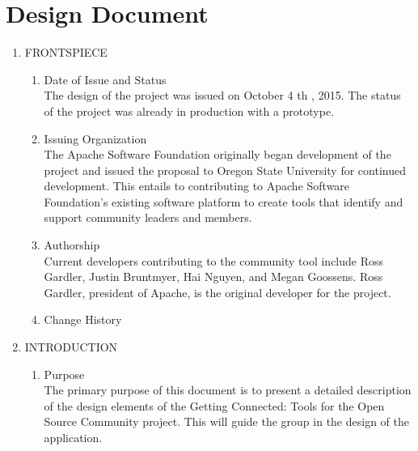 \documentclass[draftclsnofoot,10pt,onecolumn]{IEEEtran} %
\begin{document}
\section{Design Document}

\begin{enumerate}
\item FRONTSPIECE \\
	\begin{enumerate}
	
		\item Date of Issue and Status \\
		The design of the project was issued on October 4 th , 2015. The status of the project was already in production with a
		prototype.\\
		
		\item Issuing Organization \\
		The Apache Software Foundation originally began development of the project and issued the proposal to Oregon
		State University for continued development. This entails to contributing to Apache Software Foundation’s existing
		software platform to create tools that identify and support community leaders and members.\\
		
		\item Authorship \\
		Current developers contributing to the community tool include Ross Gardler, Justin Bruntmyer, Hai Nguyen, and
		Megan Goossens. Ross Gardler, president of Apache, is the original developer for the project.\\
		
		\item Change History \\
		
	\end{enumerate}
	
\item INTRODUCTION \\
	\begin{enumerate}
	
		\item Purpose \\
		The primary purpose of this document is to present a detailed description of the design elements of the Getting
		Connected: Tools for the Open Source Community project. This will guide the group in the design of the
		application.\\
		

\end{enumerate}
\end{enumerate}
\end{document}
